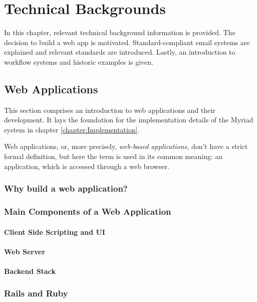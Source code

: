 \chapter{Technical Backgrounds}
\label{chapter:Technical}

In this chapter, relevant technical background information is provided. The decision to build a web app is motivated. Standard-compliant email systems are explained and relevant standards are introduced. Lastly, an introduction to workflow systems and historic examples is given.

\section{Web Applications}

This section comprises an introduction to web applications and their development. It lays the foundation for the implementation details of the Myriad system in chapter \autoref{chapter:Implementation}.

Web applications, or, more precisely, \emph{web-based applications}, don't have a strict formal definition, but here the term is used in its common meaning\cite{webapptrends}: an application, which is accessed through a web browser.

\subsection{Why build a web application?}


\subsection{Main Components of a Web Application}

\subsubsection{Client Side Scripting and UI}

\subsubsection{Web Server}

\subsubsection{Backend Stack}


\subsection{Rails and Ruby}



